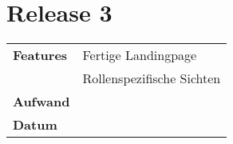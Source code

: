 
\section*{Release 3}
\label{sec:release_3}

\begin{tabular}{p{5cm} p{9cm}}
    \textbf{Features} & Fertige Landingpage \\
    & Rollenspezifische Sichten \\
    \hline
    \textbf{Aufwand} & \\
    \hline
    \textbf{Datum} & \\
\end{tabular}
